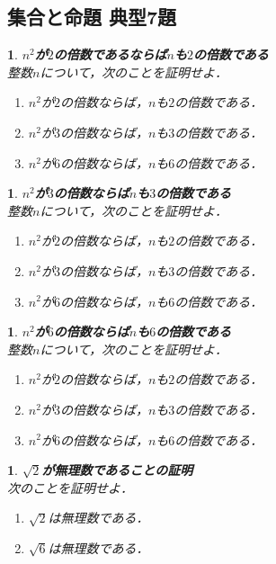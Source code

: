 \documentclass[10pt,
fleqn,
dvipdfmx,
uplatex
]{jsarticle}
\newtheorem{question}[Question]{}
\begin{document}
\subsection{集合と命題 典型7題}



\begin{question}{\bf\boldmath $n^2$が$2$の倍数であるならば$n$も$2$の倍数である}\\
整数$n$について，次のことを証明せよ．
\begin{enumerate}
\item $n^2$が$2$の倍数ならば，$n$も$2$の倍数である．
\item $n^2$が$3$の倍数ならば，$n$も$3$の倍数である．
\item $n^2$が$6$の倍数ならば，$n$も$6$の倍数である．
\end{enumerate}

\end{question}



\begin{question}{\bf\boldmath $n^2$が$3$の倍数ならば$n$も$3$の倍数である}\\
整数$n$について，次のことを証明せよ．
\begin{enumerate}
\item $n^2$が$2$の倍数ならば，$n$も$2$の倍数である．
\item $n^2$が$3$の倍数ならば，$n$も$3$の倍数である．
\item $n^2$が$6$の倍数ならば，$n$も$6$の倍数である．
\end{enumerate}

\end{question}



\begin{question}{\bf\boldmath $n^2$が$6$の倍数ならば$n$も$6$の倍数である}\\
整数$n$について，次のことを証明せよ．
\begin{enumerate}
\item $n^2$が$2$の倍数ならば，$n$も$2$の倍数である．
\item $n^2$が$3$の倍数ならば，$n$も$3$の倍数である．
\item $n^2$が$6$の倍数ならば，$n$も$6$の倍数である．
\end{enumerate}

\end{question}



\begin{question}{\bf\boldmath $\sqrt 2$が無理数であることの証明}\\
次のことを証明せよ．
\begin{enumerate}
\item $\sqrt 2$は無理数である．
\item $\sqrt 6$は無理数である．
\end{enumerate}

\end{question}
\end{document}

